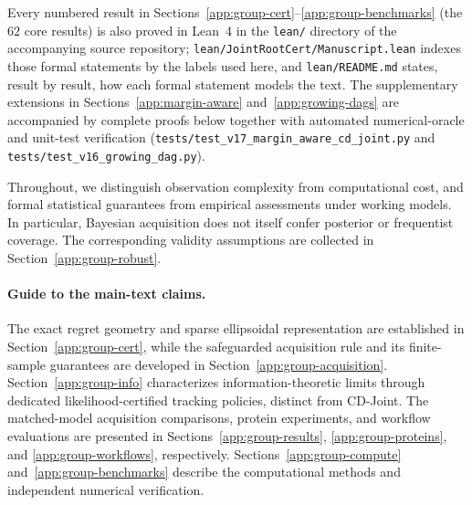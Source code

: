 \documentclass{article}
\theoremstyle{plain}
\theoremstyle{definition}
\begin{document}
Every numbered result in Sections~\ref{app:group-cert}--\ref{app:group-benchmarks}
(the $62$ core results) is also proved in Lean~4 in the
\texttt{lean/} directory of the accompanying source repository;
\texttt{lean/JointRootCert/Manuscript.lean} indexes those formal
statements by the labels used here, and \texttt{lean/README.md}
states, result by result, how each formal statement models the
text. The supplementary extensions in Sections~\ref{app:margin-aware}
and~\ref{app:growing-dags} are accompanied by complete proofs below
together with automated numerical-oracle and unit-test verification
(\texttt{tests/test\_v17\_margin\_aware\_cd\_joint.py} and
\texttt{tests/test\_v16\_growing\_dag.py}).

Throughout, we distinguish observation complexity from computational
cost, and formal statistical guarantees from empirical assessments
under working models. In particular, Bayesian acquisition does not
itself confer posterior or frequentist coverage. The corresponding
validity assumptions are collected in Section~\ref{app:group-robust}.

\paragraph{Guide to the main-text claims.}
The exact regret geometry and sparse ellipsoidal representation
are established in Section~\ref{app:group-cert}, while the
safeguarded acquisition rule and its finite-sample guarantees
are developed in Section~\ref{app:group-acquisition}.
Section~\ref{app:group-info} characterizes information-theoretic
limits through dedicated likelihood-certified tracking policies,
distinct from CD-Joint. The matched-model acquisition comparisons,
protein experiments, and workflow evaluations are presented in
Sections~\ref{app:group-results}, \ref{app:group-proteins}, and
\ref{app:group-workflows}, respectively.
Sections~\ref{app:group-compute} and~\ref{app:group-benchmarks}
describe the computational methods and independent numerical
verification.

\makeatletter
\let\supp@original@addcontentsline\addcontentsline
\renewcommand{\addcontentsline}[3]{%
  \def\supp@file{#1}\def\supp@toc{toc}%
  \ifx\supp@file\supp@toc
    \supp@original@addcontentsline{stoc}{#2}{#3}%
  \else
    \supp@original@addcontentsline{#1}{#2}{#3}%
  \fi}
\newcommand{\supplementarycontents}{%
  \begingroup\setcounter{tocdepth}{2}\small\@starttoc{stoc}\endgroup}
\makeatother
\end{document}
